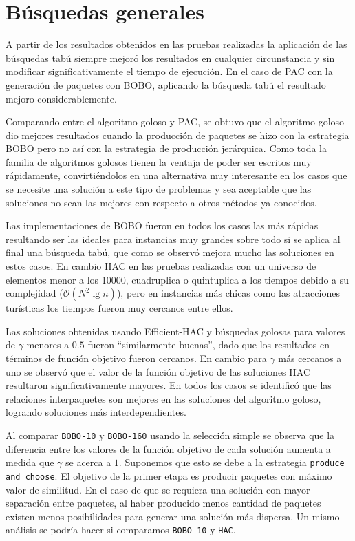\section{Búsquedas generales}
A partir de los resultados obtenidos en las pruebas realizadas la aplicación de las búsquedas tabú siempre mejoró los resultados en cualquier circunstancia y sin modificar significativamente el tiempo de ejecución. En el caso de PAC con la generación de paquetes con BOBO, aplicando la búsqueda tabú el resultado mejoro considerablemente.

Comparando entre el algoritmo goloso y PAC, se obtuvo que el algoritmo goloso dio mejores resultados cuando la producción de paquetes se hizo con la estrategia BOBO pero no así con la estrategia de producción jerárquica. Como toda la familia de algoritmos golosos tienen la ventaja de poder ser escritos muy rápidamente, convirtiéndolos en una alternativa muy interesante en los casos que se necesite una solución a este tipo de problemas y sea aceptable que las soluciones no sean las mejores con respecto a otros métodos ya conocidos.

Las implementaciones de BOBO fueron en todos los casos las más rápidas resultando ser las ideales para instancias muy grandes sobre todo si se aplica al final una búsqueda tabú, que como se observó mejora mucho las soluciones en estos casos. En cambio HAC en las pruebas realizadas con un universo de elementos menor a los 10000, cuadruplica o quintuplica a los tiempos debido a su complejidad ($\mathcal{O}(N^{2}\lg n)$), pero en instancias más chicas como las atracciones turísticas los tiempos fueron muy cercanos entre ellos.

Las soluciones obtenidas usando Efficient-HAC y búsquedas golosas para valores de $\gamma$ menores a $0.5$ fueron \textquotedblleft similarmente buenas\textquotedblright , dado que los resultados en términos de función objetivo fueron cercanos. En cambio para $\gamma$ más cercanos a uno se observó que el valor de la función objetivo de las soluciones HAC resultaron significativamente mayores. En todos los casos se identificó que las relaciones interpaquetes son mejores en las soluciones del algoritmo goloso, logrando soluciones más interdependientes.

Al comparar \texttt{BOBO-10} y \texttt{BOBO-160} usando la selección simple se observa que la diferencia entre los valores de la función objetivo de cada solución aumenta a medida que $\gamma$ se acerca a $1$. Suponemos que esto se debe a la estrategia \texttt{produce and choose}. El objetivo de la primer etapa es producir paquetes con máximo valor de similitud. En el caso de que se requiera una solución con mayor separación entre paquetes, al haber producido menos cantidad de paquetes existen menos posibilidades para generar una solución más dispersa. Un mismo análisis se podría hacer si comparamos \texttt{BOBO-10} y \texttt{HAC}.

